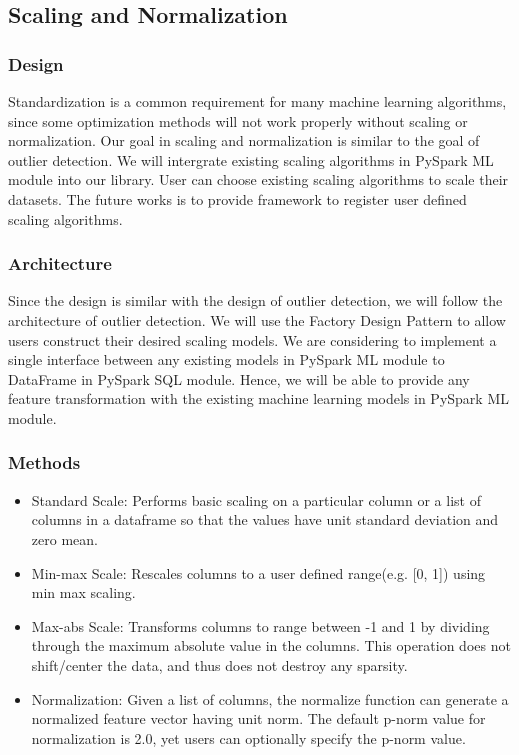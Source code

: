 \documentclass[sigconf]{acmart}
\begin{document}
\subsection{Scaling and Normalization}
\subsubsection{Design}
Standardization is a common requirement for many machine learning algorithms, since some optimization methods will not work properly without scaling or normalization\cite{convex}. Our goal in scaling and normalization is similar to the goal of outlier detection. We will intergrate existing scaling algorithms in PySpark ML module into our library. User can choose existing scaling algorithms to scale their datasets. The future works is to provide framework to register user defined scaling algorithms.

\subsubsection{Architecture}
Since the design is similar with the design of outlier detection, we will follow the architecture of outlier detection. We will use the Factory Design Pattern to allow users construct their desired scaling models. We are considering to implement a single interface between any existing models in PySpark ML module to DataFrame in PySpark SQL module. Hence, we will be able to provide any feature transformation with the existing machine learning models in PySpark ML module.

\subsubsection{Methods}
\begin{itemize}
	\item{Standard Scale}: Performs basic scaling on a particular column or a list of columns in a dataframe so that the values have unit standard deviation and zero mean. 
	\item{Min-max Scale}: Rescales columns to a user defined range(e.g. [0, 1]) using min max scaling.
	\item{Max-abs Scale}: Transforms columns to range between -1 and 1 by dividing through the maximum absolute value in the columns. This operation does not shift/center the data, and thus does not destroy any sparsity. 
	\item{Normalization}: Given a list of columns, the normalize function can generate a normalized feature vector having unit norm. The default p-norm value for normalization is 2.0, yet users can optionally specify the p-norm value.
\end{itemize}
\end{document}
